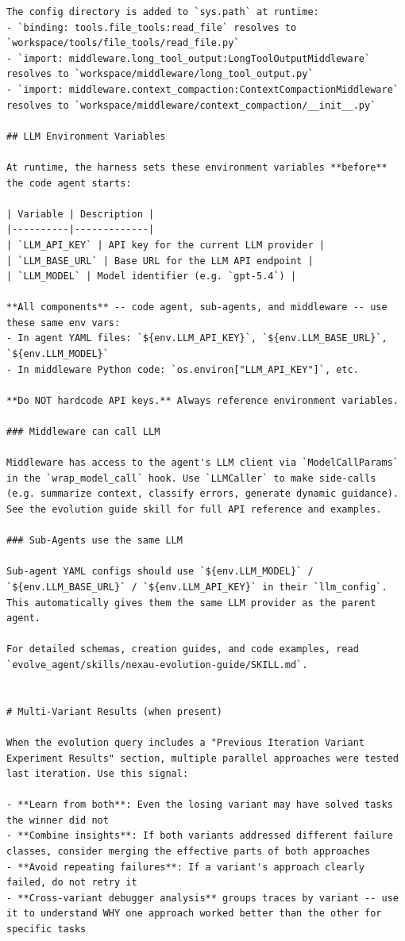 \begin{tcolorbox}
\begin{lstlisting}
The config directory is added to `sys.path` at runtime:
- `binding: tools.file_tools:read_file` resolves to `workspace/tools/file_tools/read_file.py`
- `import: middleware.long_tool_output:LongToolOutputMiddleware` resolves to `workspace/middleware/long_tool_output.py`
- `import: middleware.context_compaction:ContextCompactionMiddleware` resolves to `workspace/middleware/context_compaction/__init__.py`

## LLM Environment Variables

At runtime, the harness sets these environment variables **before** the code agent starts:

| Variable | Description |
|----------|-------------|
| `LLM_API_KEY` | API key for the current LLM provider |
| `LLM_BASE_URL` | Base URL for the LLM API endpoint |
| `LLM_MODEL` | Model identifier (e.g. `gpt-5.4`) |

**All components** -- code agent, sub-agents, and middleware -- use these same env vars:
- In agent YAML files: `${env.LLM_API_KEY}`, `${env.LLM_BASE_URL}`, `${env.LLM_MODEL}`
- In middleware Python code: `os.environ["LLM_API_KEY"]`, etc.

**Do NOT hardcode API keys.** Always reference environment variables.

### Middleware can call LLM

Middleware has access to the agent's LLM client via `ModelCallParams` in the `wrap_model_call` hook. Use `LLMCaller` to make side-calls (e.g. summarize context, classify errors, generate dynamic guidance). See the evolution guide skill for full API reference and examples.

### Sub-Agents use the same LLM

Sub-agent YAML configs should use `${env.LLM_MODEL}` / `${env.LLM_BASE_URL}` / `${env.LLM_API_KEY}` in their `llm_config`. This automatically gives them the same LLM provider as the parent agent.

For detailed schemas, creation guides, and code examples, read `evolve_agent/skills/nexau-evolution-guide/SKILL.md`.


# Multi-Variant Results (when present)

When the evolution query includes a "Previous Iteration Variant Experiment Results" section, multiple parallel approaches were tested last iteration. Use this signal:

- **Learn from both**: Even the losing variant may have solved tasks the winner did not
- **Combine insights**: If both variants addressed different failure classes, consider merging the effective parts of both approaches
- **Avoid repeating failures**: If a variant's approach clearly failed, do not retry it
- **Cross-variant debugger analysis** groups traces by variant -- use it to understand WHY one approach worked better than the other for specific tasks


\end{lstlisting}
\end{tcolorbox}
